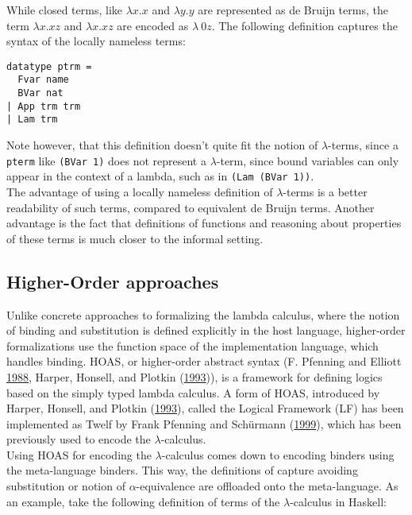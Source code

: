 \documentclass[a4paper, 12pt, twoside]{style/ociamthesis}
\theoremstyle{plain}
\theoremstyle{definition}
\theoremstyle{remark}
\begin{document}
While closed terms, like \(\lambda x.x\) and \(\lambda y.y\) are
represented as de Bruijn terms, the term \(\lambda x.xz\) and
\(\lambda x.xz\) are encoded as \(\lambda\ 0z\). The following
definition captures the syntax of the locally nameless terms:

\begin{verbatim}
datatype ptrm =
  Fvar name
  BVar nat
| App trm trm
| Lam trm
\end{verbatim}

Note however, that this definition doesn't quite fit the notion of
\(\lambda\)-terms, since a \texttt{pterm} like \texttt{(BVar 1)} does
not represent a \(\lambda\)-term, since bound variables can only appear
in the context of a lambda, such as in \texttt{(Lam (BVar 1))}.\\
The advantage of using a locally nameless definition of
\(\lambda\)-terms is a better readability of such terms, compared to
equivalent de Bruijn terms. Another advantage is the fact that
definitions of functions and reasoning about properties of these terms
is much closer to the informal setting.

\subsection{Higher-Order approaches}\label{higher-order-approaches}

Unlike concrete approaches to formalizing the lambda calculus, where the
notion of binding and substitution is defined explicitly in the host
language, higher-order formalizations use the function space of the
implementation language, which handles binding. HOAS, or higher-order
abstract syntax (F. Pfenning and Elliott
\protect\hyperlink{ref-pfenning88}{1988}, Harper, Honsell, and Plotkin
(\protect\hyperlink{ref-harper93}{1993})), is a framework for defining
logics based on the simply typed lambda calculus. A form of HOAS,
introduced by Harper, Honsell, and Plotkin
(\protect\hyperlink{ref-harper93}{1993}), called the Logical Framework
(LF) has been implemented as Twelf by Frank Pfenning and Schürmann
(\protect\hyperlink{ref-pfenning99}{1999}), which has been previously
used to encode the \(\lambda\)-calculus.\\
Using HOAS for encoding the \(\lambda\)-calculus comes down to encoding
binders using the meta-language binders. This way, the definitions of
capture avoiding substitution or notion of \(\alpha\)-equivalence are
offloaded onto the meta-language. As an example, take the following
definition of terms of the \(\lambda\)-calculus in Haskell:
\end{document}
